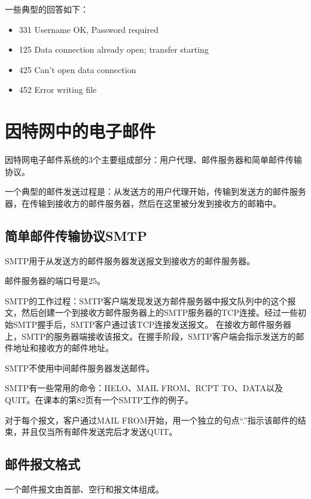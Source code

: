\documentclass[a4paper,left=2.5cm,right=2.5cm,11pt]{article}
\begin{document}
	一些典型的回答如下：
	\begin{itemize}
		\item 331 Username OK, Password required
		\item 125 Data connection already open; transfer starting
		\item 425 Can't open data connection
		\item 452 Error writing file
	\end{itemize}

\section{因特网中的电子邮件}
	因特网电子邮件系统的3个主要组成部分：用户代理、邮件服务器和简单邮件传输协议。\par

	一个典型的邮件发送过程是：从发送方的用户代理开始，传输到发送方的邮件服务器，在传输到接收方的邮件服务器，然后在这里被分发到接收方的邮箱中。

\subsection{简单邮件传输协议SMTP}
	SMTP用于从发送方的邮件服务器发送报文到接收方的邮件服务器。\par

	邮件服务器的端口号是25。\par

	SMTP的工作过程：SMTP客户端发现发送方邮件服务器中报文队列中的这个报文，然后创建一个到接收方邮件服务器上的SMTP服务器的TCP连接。经过一些初始SMTP握手后，SMTP客户通过该TCP连接发送报文。
	在接收方邮件服务器上，SMTP的服务器端接收该报文。在握手阶段，SMTP客户端会指示发送方的邮件地址和接收方的邮件地址。\par

	SMTP不使用中间邮件服务器发送邮件。\par

	SMTP有一些常用的命令：HELO、MAIL FROM、RCPT TO、DATA以及QUIT。在课本的第82页有一个SMTP工作的例子。\par

	对于每个报文，客户通过MAIL FROM开始，用一个独立的句点“.”指示该邮件的结束，并且仅当所有邮件发送完后才发送QUIT。

\subsection{邮件报文格式}
	一个邮件报文由首部、空行和报文体组成。\par
\end{document}
